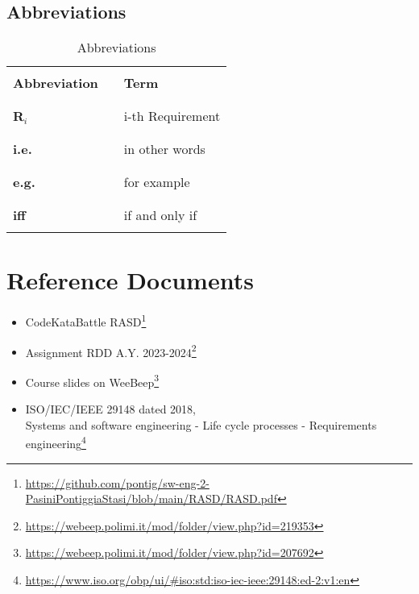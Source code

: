 \subsection{Abbreviations}
\begin{table}[H]
    \centering
    \renewcommand{\arraystretch}{0.5}
    \begin{tabular}{l l p{10.5cm}}
        \hline
                              &        &                        \\
        \textbf{Abbreviation} & \vline & \textbf{Term}          \\
                              &        &                        \\\hline & & \\
        \textbf{R}\(_i\)      & \vline & i-th Requirement       \\
                              &        &                        \\\hline & & \\
        \textbf{i.e.}         & \vline & in other words         \\
                              &        &                        \\\hline & & \\
        \textbf{e.g.}         & \vline & for example            \\
                              &        &                        \\\hline & & \\
        \textbf{iff}          & \vline & if and only if         \\
                              &        &                        \\
        \hline
    \end{tabular}
    \caption{Abbreviations}
\end{table}

\section{Reference Documents}
\begin{itemize}
    \item CodeKataBattle RASD\footnote{\url{https://github.com/pontig/sw-eng-2-PasiniPontiggiaStasi/blob/main/RASD/RASD.pdf}}
    \item Assignment RDD A.Y. 2023-2024\footnote{\url{https://webeep.polimi.it/mod/folder/view.php?id=219353}}
    \item Course slides on WeeBeep\footnote{\url{https://webeep.polimi.it/mod/folder/view.php?id=207692}}
    \item ISO/IEC/IEEE 29148 dated 2018, \\
          Systems and software engineering - Life cycle processes - Requirements engineering\footnote{\url{https://www.iso.org/obp/ui/\#iso:std:iso-iec-ieee:29148:ed-2:v1:en}}
\end{itemize}

